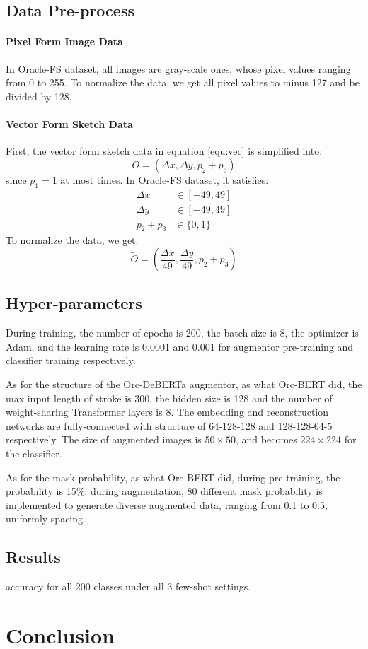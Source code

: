 \documentclass{article}
\begin{document}
\subsection{Data Pre-process}

\paragraph{Pixel Form Image Data}
In Oracle-FS dataset, all images are gray-scale ones, whose pixel values ranging from 0 to 255. To normalize the data, we get all pixel values to minus 127 and be divided by 128.

\paragraph{Vector Form Sketch Data}
First, the vector form sketch data in equation \ref{equ:vec} is simplified into:
\begin{equation*}
	O = (\Delta x, \Delta y, p_2 + p_3) 
\end{equation*} 
since $ p_1 = 1 $ at most times.
In Oracle-FS dataset, it satisfies:
\begin{align*}
	\Delta x &\in [-49, 49] \\
	\Delta y &\in [-49, 49] \\
	p_2 + p_3 &\in \{0, 1\}
\end{align*}
To normalize the data, we get:
\begin{equation*}
	\tilde{O} = 
	(\frac{\Delta x}{49}, \frac{\Delta y}{49},	p_2 + p_3) 
\end{equation*} 

\subsection{Hyper-parameters}

During training, the number of epochs is 200, the batch size is 8, the optimizer is Adam, and the learning rate is 0.0001 and 0.001 for augmentor pre-training and classifier training respectively.

As for the structure of the Orc-DeBERTa augmentor, as what Orc-BERT did, the max input length of stroke is 300, the hidden size is 128 and the number of weight-sharing Transformer layers is 8. The embedding and reconstruction networks are fully-connected with structure of 64-128-128 and 128-128-64-5 respectively. The size of augmented images is $ 50 \times 50 $, and becomes $ 224 \times 224 $ for the classifier.

As for the mask probability, as what Orc-BERT did, during pre-training, the probability is 15\%; during augmentation, 80 different mask probability is implemented to generate diverse augmented data, ranging from 0.1 to 0.5, uniformly spacing.

\subsection{Results}

accuracy for all 200 classes under all 3 few-shot settings.

\section{Conclusion}



\end{document}

